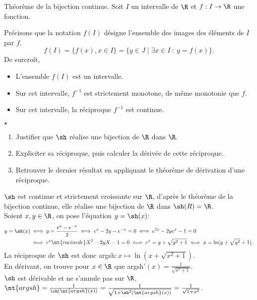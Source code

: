 \documentclass[11pt]{article}
\begin{document}
\begin{thm}{Théorème de la bijection continue.}{}
    Soit $I$ un intervalle de $\R$ et $f:I\to\R$ une fonction.\vspace*{0.2cm}
    \begin{center}
    \end{center}\vspace*{0.2cm}
    Précisons que la notation $f(I)$ désigne l'ensemble des images des éléments de $I$ par $f$.
    \begin{equation*}
        f(I)=\{f(x),x\in I\}=\{y\in J\mid \exists x \in I~:~y=f(x)\}.
    \end{equation*}
    De surcroît,
    \begin{itemize}
        \item L'ensemble $f(I)$ est un intervalle.
        \item Sur cet intervalle, $f^{-1}$ est strictement monotone, de même monotonie que $f$.
        \item Sur cet intervalle, la réciproque $f^{-1}$ est continue.
    \end{itemize}
\end{thm}

\begin{ex}{$\star$}{}
    \begin{enumerate}
        \item Justifier que $\sh$ réalise une bijection de $\R$ dans $\R$.
        \item Expliciter sa réciproque, puis calculer la dérivée de cette réciproque.
        \item Retrouver le dernier résultat en appliquant le théorème de dérivation d'une réciproque.
    \end{enumerate}
    \tcblower
     $\sh$ est continue et strictement croissante sur $\R$, d'après le théorème de la bijection continue, elle réalise une bijection de $\R$ dans $\sh(R)=\R$.\\
     Soient $x,y\in\R$, on pose l'équation $y=\sh(x)$:
    \begin{align*}
        y=\sh(x)&\iff y=\frac{e^x-e^{-x}}{2}\iff e^x-2y-e^{-x}=0\iff e^{2x}-2ye^{x}-1=0\\
        &\iff e^x \nt{ racine de } X^2-2yX-1=0 \iff e^x=y+\sqrt{y^2+1}\iff x=\ln(y+\sqrt{y^2}+1).
    \end{align*}
    La réciproque de $\sh$ est donc argsh$:x\mapsto\ln(x+\sqrt{x^2+1})$.\\
    En dérivant, on trouve pour $x\in\R$ que argsh$'(x)=\frac{1}{\sqrt{x^2+1}}$.\\
     $\sh$ est dérivable et ne s'annule pas sur $\R$, $\nt{argsh}=\frac{1}{\ch(\nt{argsh}(x))}=\frac{1}{\sqrt{1+\sh^2(\nt{argsh}(x))}}=\frac{1}{\sqrt{1+x^2}}$.
\end{ex}
\end{document}

